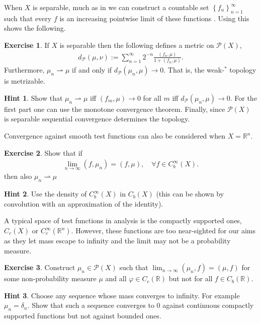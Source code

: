 \documentclass[
    a4paper,
    DIV=14,
    abstract=true,
    numbers=noenddot
]
{scrartcl}
\theoremstyle{definition}
\newtheorem{exercise}{Exercise}
\newtheorem*{hint}{Hint}
\newcommand{\set}[1]{\left\{#1\right\}}
\newcommand{\R}{\mathbb{R}}
\newcommand{\Pp}{\mathcal{P}}
\begin{document}
When $X$ is separable, much as in  we can construct a countable set $\set{f_n}_{n=1}^ \infty$ such that every $f$ is an increasing pointwise limit of these functions \cite[p.107]{ambrosio2005gradient}. Using this shows the following.
\begin{exercise}\label{ex:separability PX}
    If $X$ is separable then the following defines a metric on $\Pp (X)$,
    \begin{align*}
        d_{\Pp}(\mu , \nu ):= \sum_{n=1} ^\infty 2^{-n} \frac{(f_n,\mu )}{1+(f_n, \mu )}.
    \end{align*}
    Furthermore, $\mu _n \rightharpoonup \mu $ if and only if $d_{\Pp}(\mu _n,\mu ) \to 0$. That is, the weak-$^*$ topology is metrizable.
\end{exercise}
\begin{hint}
    Show that $\mu _n \rightharpoonup \mu $ iff $(f_m,\mu ) \to 0$ for all $m$ iff $d_{\Pp}(\mu _n,\mu ) \to 0$. For the first part one can use the monotone convergence theorem. Finally, since $\Pp (X)$ is separable sequential convergence determines the topology.
\end{hint}


Convergence against smooth test functions can also be considered when $X= \R^n$.
\begin{exercise}
    Show that if
    \begin{align*}
        \lim_{n \to \infty}(f, \mu _n)= (f,\mu ), \quad\forall f \in C_b^\infty(X).
    \end{align*}
    then also $\mu_n\rightharpoonup \mu $
\end{exercise}
\begin{hint}
    Use the density of $C_b^\infty(X)$ in $C_b(X)$ (this can be shown by convolution with an approximation of the identity).
\end{hint}
A typical space of test functions in analysis is the compactly supported ones, $C_c(X)$ or $C_c^\infty(\R^n)$. However, these functions are too near-sighted for our aims as they let mass escape to infinity and the limit may not be a probability measure.
\begin{exercise}
    Construct $\mu_n \in \Pp(X)$ such that $\lim_{n \to \infty}(\mu_n ,f )=(\mu , f )$ for some non-probability measure $\mu $ and all $\varphi \in C_c(\R)$ but not for all $f \in C_b(\R)$.
\end{exercise}
\begin{hint}
    Choose any sequence whose mass converges to infinity. For example $\mu_n = \delta _{n}$. Show that such a sequence converges to $0$ against continuous compactly supported functions but not against bounded ones.
\end{hint}
\end{document}
